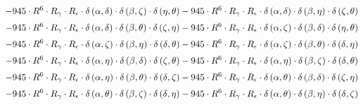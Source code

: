 \begin{subequations}
\begin{gather}
 \\[0.2em] \notag 		 - 945 \cdot R^{6} \cdot R_{\gamma{}} \cdot R_{\epsilon{}} \cdot \delta{}\left(\alpha{}, \delta{}\right) \cdot \delta{}\left(\beta{}, \zeta{}\right) \cdot \delta{}\left(\eta{}, \theta{}\right)- 945 \cdot R^{6} \cdot R_{\gamma{}} \cdot R_{\epsilon{}} \cdot \delta{}\left(\alpha{}, \delta{}\right) \cdot \delta{}\left(\beta{}, \eta{}\right) \cdot \delta{}\left(\zeta{}, \theta{}\right) 
 \\[0.2em] \notag 		 - 945 \cdot R^{6} \cdot R_{\gamma{}} \cdot R_{\epsilon{}} \cdot \delta{}\left(\alpha{}, \delta{}\right) \cdot \delta{}\left(\beta{}, \theta{}\right) \cdot \delta{}\left(\zeta{}, \eta{}\right)- 945 \cdot R^{6} \cdot R_{\gamma{}} \cdot R_{\epsilon{}} \cdot \delta{}\left(\alpha{}, \zeta{}\right) \cdot \delta{}\left(\beta{}, \delta{}\right) \cdot \delta{}\left(\eta{}, \theta{}\right) 
 \\[0.2em] \notag 		 - 945 \cdot R^{6} \cdot R_{\gamma{}} \cdot R_{\epsilon{}} \cdot \delta{}\left(\alpha{}, \zeta{}\right) \cdot \delta{}\left(\beta{}, \eta{}\right) \cdot \delta{}\left(\delta{}, \theta{}\right)- 945 \cdot R^{6} \cdot R_{\gamma{}} \cdot R_{\epsilon{}} \cdot \delta{}\left(\alpha{}, \zeta{}\right) \cdot \delta{}\left(\beta{}, \theta{}\right) \cdot \delta{}\left(\delta{}, \eta{}\right) 
 \\[0.2em] \notag 		 - 945 \cdot R^{6} \cdot R_{\gamma{}} \cdot R_{\epsilon{}} \cdot \delta{}\left(\alpha{}, \eta{}\right) \cdot \delta{}\left(\beta{}, \delta{}\right) \cdot \delta{}\left(\zeta{}, \theta{}\right)- 945 \cdot R^{6} \cdot R_{\gamma{}} \cdot R_{\epsilon{}} \cdot \delta{}\left(\alpha{}, \eta{}\right) \cdot \delta{}\left(\beta{}, \zeta{}\right) \cdot \delta{}\left(\delta{}, \theta{}\right) 
 \\[0.2em] \notag 		 - 945 \cdot R^{6} \cdot R_{\gamma{}} \cdot R_{\epsilon{}} \cdot \delta{}\left(\alpha{}, \eta{}\right) \cdot \delta{}\left(\beta{}, \theta{}\right) \cdot \delta{}\left(\delta{}, \zeta{}\right)- 945 \cdot R^{6} \cdot R_{\gamma{}} \cdot R_{\epsilon{}} \cdot \delta{}\left(\alpha{}, \theta{}\right) \cdot \delta{}\left(\beta{}, \delta{}\right) \cdot \delta{}\left(\zeta{}, \eta{}\right) 
 \\[0.2em] \notag 		 - 945 \cdot R^{6} \cdot R_{\gamma{}} \cdot R_{\epsilon{}} \cdot \delta{}\left(\alpha{}, \theta{}\right) \cdot \delta{}\left(\beta{}, \zeta{}\right) \cdot \delta{}\left(\delta{}, \eta{}\right)- 945 \cdot R^{6} \cdot R_{\gamma{}} \cdot R_{\epsilon{}} \cdot \delta{}\left(\alpha{}, \theta{}\right) \cdot \delta{}\left(\beta{}, \eta{}\right) \cdot \delta{}\left(\delta{}, \zeta{}\right) 

\end{gather}
\end{subequations}
